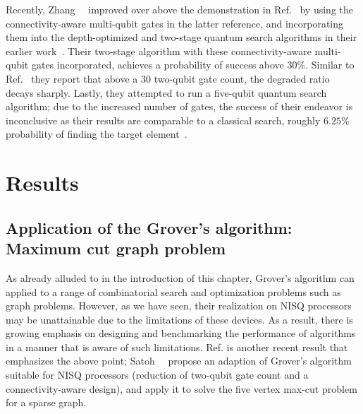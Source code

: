 \bigskip
\noindent
Recently, Zhang~\etal~\cite{Zhang_2021} improved over above the demonstration in Ref.~\cite{Gwinner_2020} by using the connectivity-aware multi-qubit gates in the latter reference, and incorporating them into the depth-optimized and two-stage quantum search algorithms in their earlier work~\cite{Zhang_2020}. Their two-stage algorithm with these connectivity-aware multi-qubit gates incorporated, achieves a probability of success above $30\%$. Similar to Ref.~\cite{Gwinner_2020} they report that above a $30$ two-qubit gate count, the degraded ratio decays sharply. Lastly, they attempted to run a five-qubit quantum search algorithm; due to the increased number of gates, the success of their endeavor is inconclusive as their results are comparable to a classical search, roughly $6.25\%$ probability of finding the target element~\cite{Zhang_2021}.

\section{Results}

\subsection{Application of the Grover's algorithm: Maximum cut graph problem}
As already alluded to in the introduction of this chapter, Grover's algorithm can applied to a range of combinatorial search and optimization problems such as graph problems. However, as we have seen, their realization on \acs{NISQ} processors may be unattainable due to the limitations of these devices. As a result, there is growing emphasis on designing and benchmarking the performance of algorithms in a manner that is aware of such limitations. Ref.\cite{Satoh_2020} is another recent result that emphasizes the above point; Satoh~\etal~\cite{Satoh_2020} propose an adaption of Grover's algorithm suitable for \acs{NISQ} processors (reduction of two-qubit gate count and a connectivity-aware design), and apply it to solve the five vertex \gls{max-cut} problem for a sparse graph.


